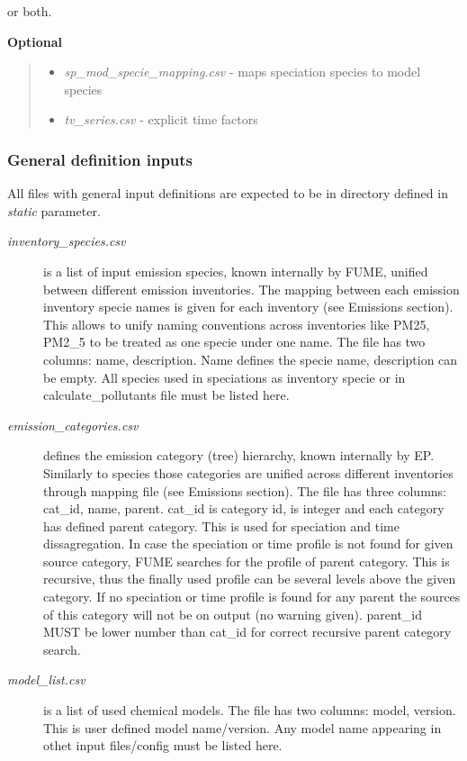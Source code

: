 \documentclass[a4paper,11pt]{article}
\begin{document}
or both.

\textbf{Optional}

\begin{quote}
\begin{itemize}
\item
  \emph{sp\_mod\_specie\_mapping.csv} - maps speciation species to model
  species
\item
  \emph{tv\_series.csv} - explicit time factors
\end{itemize}
\end{quote}

\subsubsection{General definition inputs}\label{general-definition-inputs}

All files with general input definitions are expected to be in directory
defined in \emph{static} parameter.

\begin{description}
\item[\emph{inventory\_species.csv}]
is a list of input emission species, known internally by FUME, unified
between different emission inventories. The mapping between each
emission inventory specie names is given for each inventory (see
Emissions section). This allows to unify naming conventions across
inventories like PM25, PM2\_5 to be treated as one specie under one
name. The file has two columns: name, description. Name defines the
specie name, description can be empty. All species used in speciations
as inventory specie or in calculate\_pollutants file must be listed
here.
\item[\emph{emission\_categories.csv}]
defines the emission category (tree) hierarchy, known internally by EP.
Similarly to species those categories are unified across different
inventories through mapping file (see Emissions section). The file has
three columns: cat\_id, name, parent. cat\_id is category id, is integer
and each category has defined parent category. This is used for
speciation and time dissagregation. In case the speciation or time
profile is not found for given source category, FUME searches for the
profile of parent category. This is recursive, thus the finally used
profile can be several levels above the given category. If no speciation
or time profile is found for any parent the sources of this category
will not be on output (no warning given). parent\_id MUST be lower
number than cat\_id for correct recursive parent category search.
\item[\emph{model\_list.csv}]
is a list of used chemical models. The file has two columns: model,
version. This is user defined model name/version. Any model name
appearing in othet input files/config must be listed here.
\end{description}
\end{document}
